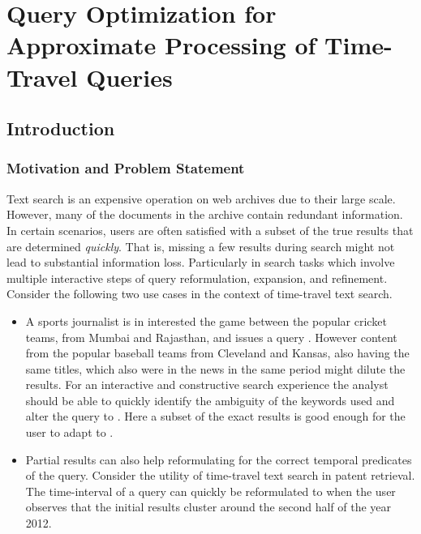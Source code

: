 \chapter{Query Optimization for Approximate Processing of Time-Travel Queries}
\label{chap:selection}

\section{Introduction}
\label{sec:intro}
\subsection{Motivation and Problem Statement}

 Text search is an expensive operation on web archives due to their large scale. However, many of the documents in the archive contain redundant information. In certain scenarios, users are often satisfied with a subset of the true results that are determined \emph{quickly}. That is, missing a few results during search might not lead to substantial information loss. Particularly in search tasks which involve multiple interactive steps of query reformulation, expansion, and refinement. Consider the following two use cases in the context of time-travel text search. 

\begin{itemize}

  \item A sports journalist is in interested the game between the popular cricket teams, from Mumbai and Rajasthan, and issues a query . However content from the popular baseball teams from Cleveland and Kansas, also having the same titles, which also were in the news in the same period might dilute the results. For an interactive and constructive search experience the analyst should be able to quickly identify the ambiguity of the keywords used and alter the query to . Here a subset of the exact results is good enough for the user to adapt  to . 

  \item  Partial results can also help reformulating for the correct temporal predicates of the query. Consider the utility of time-travel text search in patent retrieval. The time-interval of a query  can quickly be reformulated to  when the user observes that the initial results cluster around the second half of the year 2012. 

\end{itemize}

